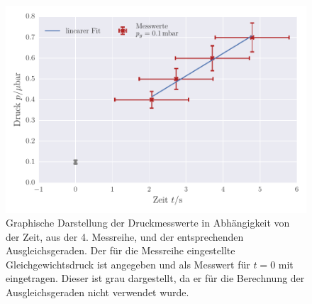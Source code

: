 \begin{figure}[!h]
 \centering
 \includegraphics[scale=0.8]{../Grafiken/Leckrate_Turbo_3.pdf}
 \caption{Graphische Darstellung der Druckmesswerte in Abhängigkeit von der Zeit, aus der 4. Messreihe, und der
 	entsprechenden Ausgleichsgeraden. Der für die Messreihe eingestellte Gleichgewichtsdruck ist angegeben und als Messwert für $t=0$ mit eingetragen. Dieser ist grau dargestellt, da er für die 
 	Berechnung der Ausgleichsgeraden nicht verwendet wurde.  \label{fig:leckrate_turbo_3}}
 \end{figure} 